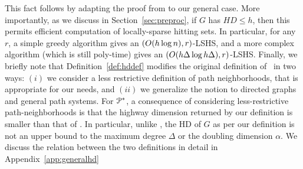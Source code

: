 This fact follows by adapting the proof from \cite[Theorem 4.2]{highway2013} to our general case.
More importantly, as we discuss in Section~\ref{sec:preproc}, if $G$ has $HD \leq h$, then this permits efficient computation of locally-sparse hitting sets.
In particular, for any $r$, a simple greedy algorithm gives an $(O(h\log n),r)$-LSHS, and a more complex algorithm (which is still poly-time) gives an $(O(h\Delta\log h\Delta),r)$-LSHS.
Finally, we briefly note that Definition~\ref{def:hddef} modifies the original definition of~\cite{highway2013} in two ways: $(i)$ we consider a less restrictive definition of path neighborhoods, that is appropriate for our needs, and $(ii)$ we generalize the notion to directed graphs and general path systems.
For $\mathcal{P}^*$, a consequence of considering less-restrictive path-neighborhoods is that the highway dimension returned by our definition is smaller than that of \cite{highway2013}.
In particular, unlike \cite{highway2013}, the HD of $G$ as per our definition is not an upper bound to the maximum degree $\Delta$ or the doubling dimension $\alpha$.
We discuss the relation between the two definitions in detail in Appendix~\ref{app:generalhd}